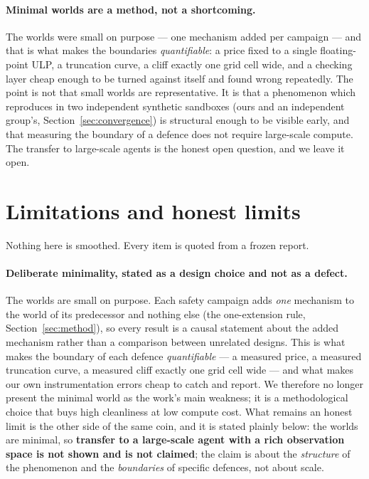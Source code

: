 \documentclass[11pt]{article}
\begin{document}
\paragraph{Minimal worlds are a method, not a shortcoming.} The worlds were small on
purpose --- one mechanism added per campaign --- and that is what makes the boundaries
\emph{quantifiable}: a price fixed to a single floating-point ULP, a truncation curve,
a cliff exactly one grid cell wide, and a checking layer cheap enough to be turned
against itself and found wrong repeatedly. The point is not that small worlds are
representative. It is that a phenomenon which reproduces in two independent synthetic
sandboxes (ours and an independent group's, Section~\ref{sec:convergence}) is
structural enough to be visible early, and that measuring the boundary of a defence
does not require large-scale compute. The transfer to large-scale agents is the honest
open question, and we leave it open.

\section{Limitations and honest limits}
\label{sec:limitations}

Nothing here is smoothed. Every item is quoted from a frozen report.

\paragraph{Deliberate minimality, stated as a design choice and not as a defect.} The
worlds are small on purpose. Each safety campaign adds \emph{one} mechanism to the
world of its predecessor and nothing else (the one-extension rule,
Section~\ref{sec:method}), so every result is a causal statement about the added
mechanism rather than a comparison between unrelated designs. This is what makes the
boundary of each defence \emph{quantifiable} --- a measured price, a measured
truncation curve, a measured cliff exactly one grid cell wide --- and what makes our
own instrumentation errors cheap to catch and report. We therefore no longer present
the minimal world as the work's main weakness; it is a methodological choice that buys
high cleanliness at low compute cost. What remains an honest limit is the other side of
the same coin, and it is stated plainly below: the worlds are minimal, so
\textbf{transfer to a large-scale agent with a rich observation space is not shown and
is not claimed}; the claim is about the \emph{structure} of the phenomenon and the
\emph{boundaries} of specific defences, not about scale.
\end{document}
